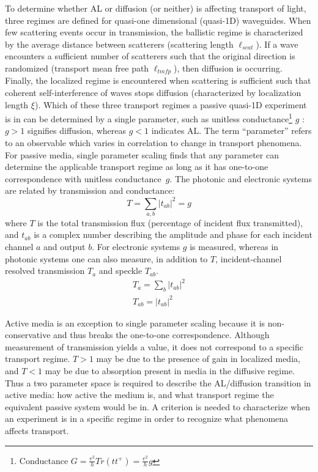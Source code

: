 To determine whether AL or diffusion (or neither) is affecting transport of light, three regimes are defined for quasi-one dimensional (quasi-1D) waveguides. When few scattering events occur in transmission, the ballistic regime is characterized by the average distance between scatterers (scattering length $\ell_{scat}$). If a wave encounters a sufficient number of scatterers such that the original direction is randomized (transport mean free path $\ell_{tmfp}$), then diffusion is occurring. Finally, the localized regime is encountered when scattering is sufficient such that coherent self-interference of waves stops diffusion (characterized by localization length $\xi$). Which of these three transport regimes a passive quasi-1D experiment is in can be determined by a single parameter, such as unitless conductance\footnote{Conductance $G=\frac{e^2}{h}Tr(tt^+)=\frac{e^2}{h}g$\cite{1981_Abrahams}} $g$ \cite{1979_Anderson}:  $g>1$ signifies diffusion, whereas $g<1$ indicates AL. The term ``parameter'' refers to an observable which varies in correlation to change in transport phenomena. For passive media, single parameter scaling finds that any parameter can determine the applicable transport regime as long as it has one-to-one correspondence with unitless conductance~$g$. The photonic and electronic systems are related by transmission and conductance\cite{1981_Fisher}:
\begin{equation}
 T = \sum_{a,b} |t_{ab}|^2 = g
\end{equation}
where $T$ is the total transmission flux (percentage of incident flux transmitted), and $t_{ab}$ is a complex number describing the amplitude and phase for each incident channel $a$ and output $b$. For electronic systems $g$ is measured, whereas in photonic systems one can also measure, in addition to $T$, incident-channel resolved transmission $T_{a}$ and speckle $T_{ab}$. 
\begin{equation}
\begin{gathered}
 T_a = \sum_b |t_{ab}|^2 \\
 T_{ab} = |t_{ab}|^2
\end{gathered}
\end{equation}

Active media is an exception to single parameter scaling because it is non-conservative and thus breaks the one-to-one correspondence\cite{1994_Freilikher_absorption}. Although measurement of transmission yields a value, it does not correspond to a specific transport regime. $T>1$ may be due to the presence of gain in localized media, and $T<1$ may be due to absorption present in media in the diffusive regime. Thus a two parameter space is required to describe the AL/diffusion transition in active media: how active the medium is, and what transport regime the equivalent passive system would be in. A criterion is needed to characterize when an experiment is in a specific regime in order to recognize what phenomena affects transport.

